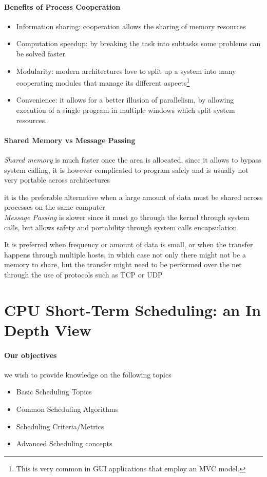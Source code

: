 \documentclass[openright, twoside]{report}
\theoremstyle{definition}
\theoremstyle{example}
\begin{document}
			\paragraph{Benefits of Process Cooperation}
				\begin{itemize}
					\item Information sharing: cooperation allows the sharing of memory resources 
					\item Computation speedup: by breaking the task into subtasks some problems can be solved faster
					\item Modularity: modern architectures love to split up a system into many cooperating modules that 
					manage its different aspects\footnote{This is very common in GUI applications that employ an MVC model.}
					\item Convenience: it allows for a better illusion of parallelism, by allowing execution of a single program 
					in multiple windows which split system resources. 
 				\end{itemize}

			\paragraph{Shared Memory vs Message Passing}
				\emph{Shared memory} is much faster once the area is allocated, since it allows to bypass system calling,
				it is however complicated to program safely and is usually not very portable across architectures

				it is the preferable alternative when a large amount of data must be shared across processes on
				the same computer \\

				\emph{Message Passing} is slower since it must go through the kernel through system calls, but 
				allows safety and portability through system calls encapsulation

				It is preferred when frequency or amount of data is small, or when the transfer happens through
				multiple hosts, in which case not only there might not be a memory to share, but the transfer 
				might need to be performed over the net through the use of protocols such as 
				TCP or UDP.

	\section{CPU Short-Term Scheduling: an In Depth View}
			\paragraph{Our objectives}
			we wish to provide knowledge on the following topics
			\begin{itemize}
				\item Basic Scheduling Topics
				\item Common Scheduling Algorithms
				\item Scheduling Criteria/Metrics
				\item Advanced Scheduling concepts
			\end{itemize}
\end{document}
